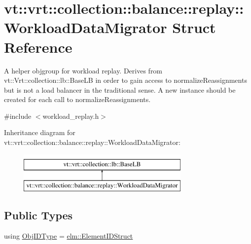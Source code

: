 \hypertarget{structvt_1_1vrt_1_1collection_1_1balance_1_1replay_1_1_workload_data_migrator}{}\section{vt\+:\+:vrt\+:\+:collection\+:\+:balance\+:\+:replay\+:\+:Workload\+Data\+Migrator Struct Reference}
\label{structvt_1_1vrt_1_1collection_1_1balance_1_1replay_1_1_workload_data_migrator}


A helper objgroup for workload replay. Derives from {\ttfamily vt\+::\+Vrt\+::collection\+::lb\+::\+Base\+LB} in order to gain access to normalize\+Reassignments but is not a load balancer in the traditional sense. A new instance should be created for each call to normalize\+Reassignments.  




{\ttfamily \#include $<$workload\+\_\+replay.\+h$>$}

Inheritance diagram for vt\+:\+:vrt\+:\+:collection\+:\+:balance\+:\+:replay\+:\+:Workload\+Data\+Migrator\+:\begin{figure}[H]
\begin{center}
\leavevmode
\includegraphics[height=2.000000cm]{structvt_1_1vrt_1_1collection_1_1balance_1_1replay_1_1_workload_data_migrator}
\end{center}
\end{figure}
\subsection*{Public Types}
\begin{DoxyCompactItemize}
\item 
using \hyperlink{structvt_1_1vrt_1_1collection_1_1balance_1_1replay_1_1_workload_data_migrator_a53a10e064c9a2e5306558ec2d5dd09aa}{Obj\+I\+D\+Type} = \hyperlink{structvt_1_1elm_1_1_element_i_d_struct}{elm\+::\+Element\+I\+D\+Struct}
\end{DoxyCompactItemize}
